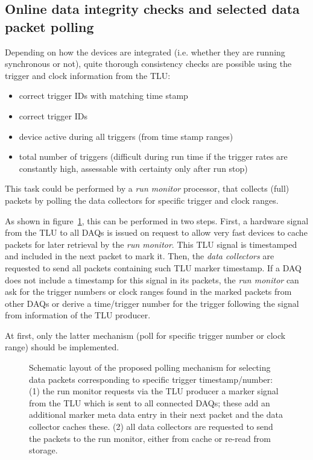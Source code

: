 \documentclass[paper=a4, fontsize=11pt]{scrartcl}	%
\numberwithin{equation}{section}		%
\numberwithin{figure}{section}			%
\numberwithin{table}{section}				%
\begin{document}
\subsection{Online data integrity checks and selected data packet polling}
\label{sec:integrity}
Depending on how the devices are integrated (i.e. whether they are running
synchronous or not), quite thorough consistency checks are
possible using the trigger and clock information from the TLU:

\begin{itemize}
\item correct trigger IDs with matching time stamp
\item correct trigger IDs
\item device active during all triggers (from time stamp ranges)
\item total number of triggers (difficult during run time if the trigger
  rates are constantly high, assessable with certainty only after run stop)
\end{itemize}

This task could be performed by a \emph{run monitor} processor, that
collects (full) packets by polling the data collectors for specific
trigger and clock ranges.

As shown in figure~\ref{fig:schematicpolling}, this can be performed
in two steps. First, a hardware signal from the TLU to all DAQs is
issued on request to allow very fast devices to cache packets for
later retrieval by the \emph{run monitor}. This TLU signal is
timestamped and included in the next packet to mark it. Then, the
\emph{data collectors} are requested to send all packets containing
such TLU marker timestamp. If a DAQ does not include a timestamp for
this signal in its packets, the \emph{run monitor} can ask for the
trigger numbers or clock ranges found in the marked packets from other
DAQs or derive a time/trigger number for the trigger following the
signal from information of the TLU producer.

At first, only the latter mechanism (poll for specific trigger number
or clock range) should be implemented.

\begin{figure}[htbp]
  \centering
  
  \caption{Schematic layout of the proposed polling mechanism for
    selecting data packets corresponding to specific trigger
    timestamp/number: (1) the run monitor requests via the TLU
    producer a marker signal from the TLU which is sent to all
    connected DAQs; these add an additional marker meta data entry in
    their next packet and the data collector caches these. (2) all
    data collectors are requested to send the packets to the run
    monitor, either from cache or re-read from storage.}
\label{fig:schematicpolling}
\end{figure}
\end{document}
